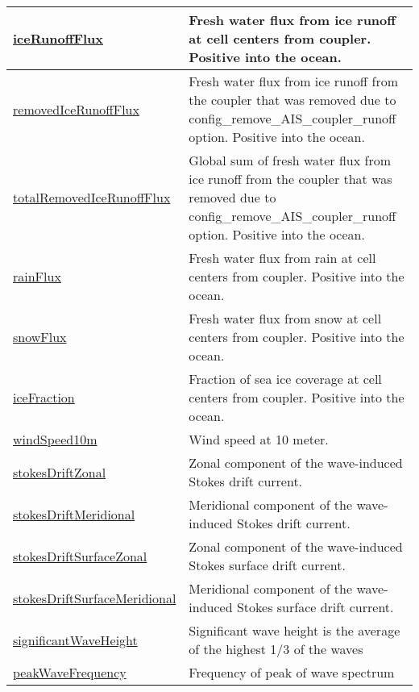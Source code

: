 {\begin{center}
\begin{longtable}{| p{2.0in} | p{4.0in} |}
    \hline
    \hyperref[subsec:var_sec_forcing_iceRunoffFlux]{iceRunoffFlux} & Fresh water flux from ice runoff at cell centers from coupler. Positive into the ocean. \\
    \hline
    \hyperref[subsec:var_sec_forcing_removedIceRunoffFlux]{removedIceRunoffFlux} & Fresh water flux from ice runoff from the coupler that was removed due to config\_remove\_AIS\_coupler\_runoff option. Positive into the ocean. \\
    \hline
    \hyperref[subsec:var_sec_forcing_totalRemovedIceRunoffFlux]{totalRemovedIceRunoffFlux} & Global sum of fresh water flux from ice runoff from the coupler that was removed due to config\_remove\_AIS\_coupler\_runoff option. Positive into the ocean. \\
    \hline
    \hyperref[subsec:var_sec_forcing_rainFlux]{rainFlux} & Fresh water flux from rain at cell centers from coupler. Positive into the ocean. \\
    \hline
    \hyperref[subsec:var_sec_forcing_snowFlux]{snowFlux} & Fresh water flux from snow at cell centers from coupler. Positive into the ocean. \\
    \hline
    \hyperref[subsec:var_sec_forcing_iceFraction]{iceFraction} & Fraction of sea ice coverage at cell centers from coupler. Positive into the ocean. \\
    \hline
    \hyperref[subsec:var_sec_forcing_windSpeed10m]{windSpeed10m} & Wind speed at 10 meter. \\
    \hline
    \hyperref[subsec:var_sec_forcing_stokesDriftZonal]{stokesDriftZonal} & Zonal component of the wave-induced Stokes drift current. \\
    \hline
    \hyperref[subsec:var_sec_forcing_stokesDriftMeridional]{stokesDriftMeridional} & Meridional component of the wave-induced Stokes drift current. \\
    \hline
    \hyperref[subsec:var_sec_forcing_stokesDriftSurfaceZonal]{stokesDriftSurfaceZonal} & Zonal component of the wave-induced Stokes surface drift current. \\
    \hline
    \hyperref[subsec:var_sec_forcing_stokesDriftSurfaceMeridional]{stokesDriftSurfaceMeridional} & Meridional component of the wave-induced Stokes surface drift current. \\
    \hline
    \hyperref[subsec:var_sec_forcing_significantWaveHeight]{significantWaveHeight} & Significant wave height is the average of the highest 1/3 of the waves \\
    \hline
    \hyperref[subsec:var_sec_forcing_peakWaveFrequency]{peakWaveFrequency} & Frequency of peak of wave spectrum \\

\end{longtable}
\end{center}}
